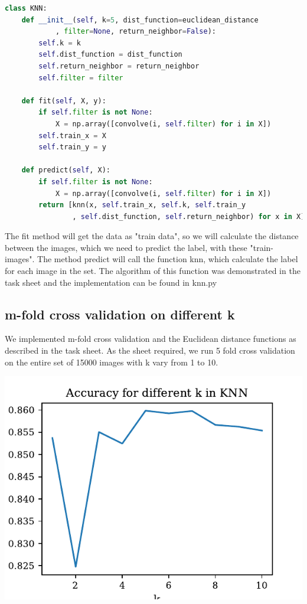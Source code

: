 \documentclass[11pt]{article}
\begin{document}
\begin{lstlisting}[language=python, caption=KNN class]
class KNN:
    def __init__(self, k=5, dist_function=euclidean_distance
            , filter=None, return_neighbor=False):
        self.k = k
        self.dist_function = dist_function
        self.return_neighbor = return_neighbor
        self.filter = filter

    def fit(self, X, y):
        if self.filter is not None:
            X = np.array([convolve(i, self.filter) for i in X])
        self.train_x = X
        self.train_y = y

    def predict(self, X):
        if self.filter is not None:
            X = np.array([convolve(i, self.filter) for i in X])
        return [knn(x, self.train_x, self.k, self.train_y
                , self.dist_function, self.return_neighbor) for x in X]
\end{lstlisting}


The fit method will get the data as "train data", so we will calculate the distance between the images, which we need to predict the label, with these "train-images". The method predict will call the function knn, which calculate the label for each image in the set. The algorithm of this function was demonstrated in the task sheet and the implementation can be found in knn.py

\subsection{m-fold cross validation on different k}

We implemented m-fold cross validation and the Euclidean distance functions as described in the task sheet. As the sheet required, we run 5 fold cross validation on the entire set of 15000 images with k vary from 1 to 10.

\includegraphics{figures/1c_knn_acc_k.pdf}
\end{document}
